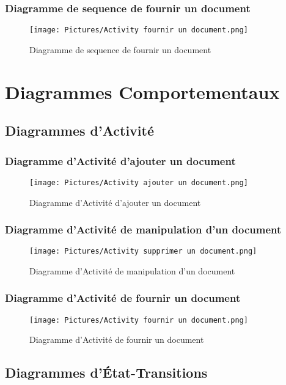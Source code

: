 \documentclass[11pt,fleqn]{book} %
\begin{document}
\subsubsection{Diagramme de sequence de fournir un document}
\begin{figure}[h]
    \centering
    \texttt{[image: Pictures/Activity fournir un document.png]}
    \caption{Diagramme de sequence de fournir un document}
    \label{fig:pca}
\end{figure}
\newpage
\section{Diagrammes Comportementaux}
\subsection{Diagrammes d’Activité}
\subsubsection{Diagramme d’Activité d'ajouter un document}
\begin{figure}[h]
    \centering
    \texttt{[image: Pictures/Activity ajouter un document.png]}
    \caption{Diagramme d’Activité d'ajouter un document}
    \label{fig:pca}
\end{figure}
\newpage
\subsubsection{Diagramme d’Activité de manipulation d'un document}
\begin{figure}[h]
    \centering
    \texttt{[image: Pictures/Activity supprimer un document.png]}
    \caption{Diagramme d’Activité de manipulation d'un document}
    \label{fig:pca}
\end{figure}
\newpage
\subsubsection{Diagramme d’Activité de fournir un document}
\begin{figure}[h]
    \centering
    \texttt{[image: Pictures/Activity fournir un document.png]}
    \caption{Diagramme d’Activité de fournir un document}
    \label{fig:pca}
\end{figure}
\newpage
\subsection{Diagrammes d’État-Transitions}
\end{document}
